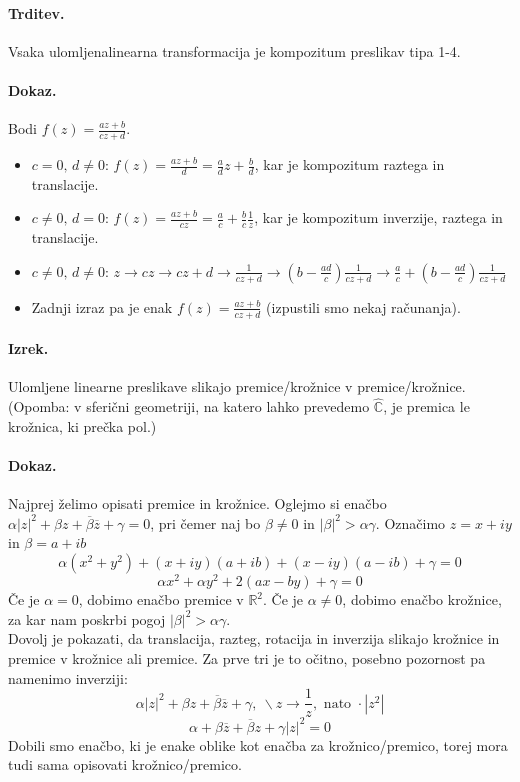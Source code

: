 \documentclass[a4paper]{article}
\newcommand{\C}{\mathbb{C}}
\newcommand{\R}{\mathbb{R}}
\begin{document}
\paragraph{Trditev.} Vsaka ulomljenalinearna transformacija je kompozitum preslikav tipa 1-4.
\paragraph{Dokaz.} Bodi $\displaystyle{f(z) = \frac{az + b}{cz + d}}$.
\begin{itemize}
    \item $c=0,\,d\neq0$: $\displaystyle{f(z) = \frac{az + b}{d}} = \frac{a}{d}z + \frac{b}{d}$, kar je kompozitum raztega in translacije.
    \item $c\neq0,\,d=0$: $\displaystyle{f(z) = \frac{az + b}{cz}} = \frac{a}{c} + \frac{b}{c}\frac{1}{z}$, kar je kompozitum inverzije, raztega in translacije.
    \item $c\neq0,\,d\neq0$: $\displaystyle{z \to cz \to cz + d \to \frac{1}{cz + d} \to \left(b -\frac{ad}{c}\right)\frac{1}{cz + d} \to \frac{a}{c} + \left(b -\frac{ad}{c}\right)\frac{1}{cz + d}}$
    \item Zadnji izraz pa je enak $f(z) = \displaystyle{\frac{az + b}{cz + d}}$ \hspace{2ex} (izpustili smo nekaj računanja).
\end{itemize}
\paragraph{Izrek.} Ulomljene linearne preslikave slikajo premice/krožnice v premice/krožnice. \\
(Opomba: v sferični geometriji, na katero lahko prevedemo $\hat{\C}$, je premica le krožnica, ki prečka pol.)
\paragraph{Dokaz.} Najprej želimo opisati premice in krožnice. Oglejmo si enačbo $\displaystyle{\alpha |z|^2 + \beta z + \overline{\beta}\overline{z} + \gamma = 0}$, pri čemer naj bo $\beta \neq 0$ in $|\beta|^2 > \alpha\gamma$.
Označimo $z = x+iy$ in $\beta = a+ib$
$$\alpha(x^2 + y^2) + (x + iy)(a + ib) + (x-iy)(a-ib) + \gamma = 0$$
$$\alpha x^2 + \alpha y^2 + 2(ax - by) + \gamma = 0$$
Če je $\alpha = 0$, dobimo enačbo premice v $\R^2$. Če je $\alpha \neq 0$, dobimo enačbo krožnice, za kar nam poskrbi pogoj $|\beta|^2 > \alpha\gamma$. \\
Dovolj je pokazati, da translacija, razteg, rotacija in inverzija slikajo krožnice in premice v krožnice ali premice. Za prve tri je to očitno, posebno pozornost pa namenimo inverziji:
$$\alpha |z|^2 + \beta z + \overline{\beta} \overline{z} + \gamma,~\backslash z \to \frac{1}{z}, \text{ nato } \cdot |z^2|$$
$$\alpha + \beta\overline{z} + \overline{\beta}z + \gamma |z|^2 = 0$$
Dobili smo enačbo, ki je enake oblike kot enačba za krožnico/premico, torej mora tudi sama opisovati krožnico/premico.
\end{document}
